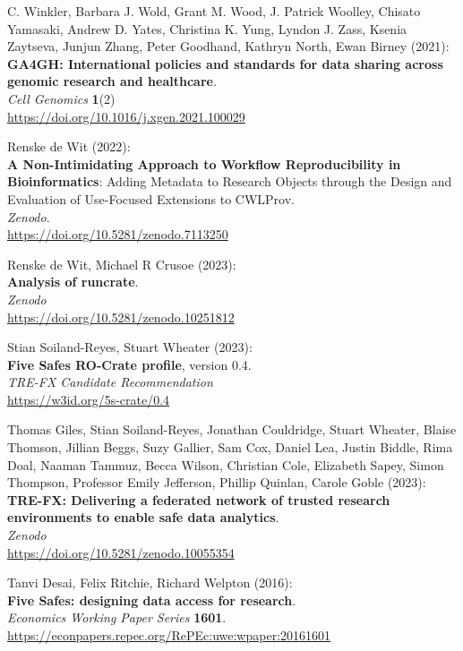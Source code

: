 \documentclass[10pt,letterpaper]{article}
\begin{document}
\begin{thebibliography}{10}
\begin{small}
C. Winkler, Barbara J. Wold, Grant M. Wood, J. Patrick Woolley, Chisato Yamasaki, Andrew D. Yates, Christina K. Yung, Lyndon J. Zass, Ksenia Zaytseva, Junjun Zhang, Peter Goodhand, Kathryn North, Ewan Birney (2021):\\
\textbf{GA4GH: International policies and standards for data sharing
across genomic research and healthcare}.\\
\emph{Cell Genomics} \textbf{1}(2)\\
\url{https://doi.org/10.1016/j.xgen.2021.100029}

Renske de Wit (2022):\\
\textbf{A Non-Intimidating Approach to Workflow Reproducibility in Bioinformatics}: Adding Metadata to Research Objects through the Design and Evaluation of Use-Focused Extensions to CWLProv.\\
\emph{Zenodo}.\\
\url{https://doi.org/10.5281/zenodo.7113250}

Renske de Wit, Michael R Crusoe (2023):\\
\textbf{Analysis of runcrate}.\\
\emph{Zenodo}\\
\url{https://doi.org/10.5281/zenodo.10251812}

Stian Soiland-Reyes, Stuart Wheater (2023):\\
\textbf{Five Safes RO-Crate profile}, version 0.4.\\
\emph{TRE-FX Candidate Recommendation} \\
\url{https://w3id.org/5s-crate/0.4}

Thomas Giles, Stian Soiland-Reyes, Jonathan Couldridge, Stuart Wheater, Blaise Thomson, Jillian Beggs, Suzy Gallier, Sam Cox, Daniel Lea, Justin Biddle, Rima Doal, Naaman Tammuz, Becca Wilson, Christian Cole, Elizabeth Sapey, Simon Thompson, Professor Emily Jefferson, Phillip Quinlan, Carole Goble (2023):\\
\textbf{TRE-FX: Delivering a federated network of trusted research environments to enable safe data analytics}.\\
\emph{Zenodo} \\
\url{https://doi.org/10.5281/zenodo.10055354}

Tanvi Desai, Felix Ritchie, Richard Welpton (2016):\\
\textbf{Five Safes: designing data access for research}.\\
\emph{Economics Working Paper Series} \textbf{1601}.\\
\url{https://econpapers.repec.org/RePEc:uwe:wpaper:20161601}


\end{small}
\end{thebibliography}
\end{document}
